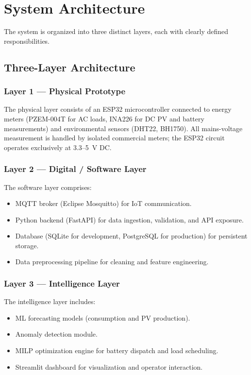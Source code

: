 \chapter{System Architecture}
\label{ch:architecture}

The system is organized into three distinct layers, each with clearly defined responsibilities.

\section{Three-Layer Architecture}

\subsection{Layer 1 --- Physical Prototype}

The physical layer consists of an ESP32 microcontroller connected to energy meters (PZEM-004T for AC loads, INA226 for DC PV and battery measurements) and environmental sensors (DHT22, BH1750). All mains-voltage measurement is handled by isolated commercial meters; the ESP32 circuit operates exclusively at 3.3--5~V DC.

\subsection{Layer 2 --- Digital / Software Layer}

The software layer comprises:
\begin{itemize}[nosep]
    \item MQTT broker (Eclipse Mosquitto) for IoT communication.
    \item Python backend (FastAPI) for data ingestion, validation, and API exposure.
    \item Database (SQLite for development, PostgreSQL for production) for persistent storage.
    \item Data preprocessing pipeline for cleaning and feature engineering.
\end{itemize}

\subsection{Layer 3 --- Intelligence Layer}

The intelligence layer includes:
\begin{itemize}[nosep]
    \item ML forecasting models (consumption and PV production).
    \item Anomaly detection module.
    \item MILP optimization engine for battery dispatch and load scheduling.
    \item Streamlit dashboard for visualization and operator interaction.
\end{itemize}

